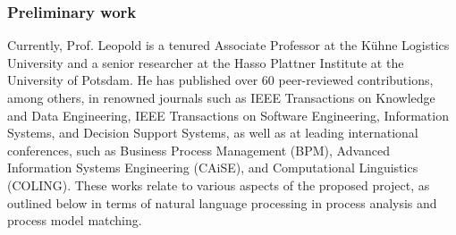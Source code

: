 %


\subsubsection{Preliminary work}


Currently, Prof. Leopold is a tenured Associate Professor at the Kühne Logistics University and a senior researcher at the Hasso Plattner Institute at the University of Potsdam. He has published over 60 peer-reviewed contributions, among others, in renowned journals such as IEEE Transactions on Knowledge and Data Engineering, IEEE Transactions on Software Engineering, Information Systems, and Decision Support Systems, as well as at leading international conferences, such as Business Process Management (BPM), Advanced Information Systems Engineering (CAiSE), and Computational Linguistics (COLING). These works relate to various aspects of the proposed project, as outlined below in terms of natural language processing in process analysis and process model matching.

